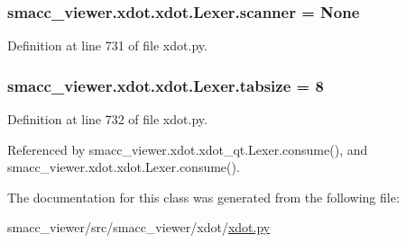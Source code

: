 \subsubsection[{\texorpdfstring{scanner}{scanner}}]{\setlength{\rightskip}{0pt plus 5cm}smacc\+\_\+viewer.\+xdot.\+xdot.\+Lexer.\+scanner = None\hspace{0.3cm}{\ttfamily [static]}}\hypertarget{classsmacc__viewer_1_1xdot_1_1xdot_1_1Lexer_a0d2ace7acb07ed25a224fbdea1cfba89}{}\label{classsmacc__viewer_1_1xdot_1_1xdot_1_1Lexer_a0d2ace7acb07ed25a224fbdea1cfba89}


Definition at line 731 of file xdot.\+py.

\subsubsection[{\texorpdfstring{tabsize}{tabsize}}]{ smacc\+\_\+viewer.\+xdot.\+xdot.\+Lexer.\+tabsize = 8\hspace{0.3cm}{\ttfamily [static]}}\hypertarget{classsmacc__viewer_1_1xdot_1_1xdot_1_1Lexer_a54e3985e9e746bf106819b7a3b340646}{}\label{classsmacc__viewer_1_1xdot_1_1xdot_1_1Lexer_a54e3985e9e746bf106819b7a3b340646}


Definition at line 732 of file xdot.\+py.



Referenced by smacc\+\_\+viewer.\+xdot.\+xdot\+\_\+qt.\+Lexer.\+consume(), and smacc\+\_\+viewer.\+xdot.\+xdot.\+Lexer.\+consume().



The documentation for this class was generated from the following file\+:\begin{DoxyCompactItemize}
\item 
smacc\+\_\+viewer/src/smacc\+\_\+viewer/xdot/\hyperlink{xdot_8py}{xdot.\+py}\end{DoxyCompactItemize}
